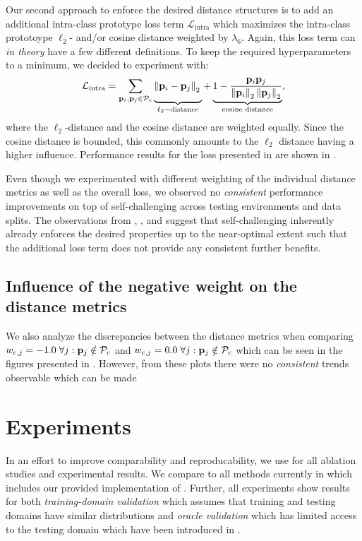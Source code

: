 Our second approach to enforce the desired distance structures is to add an additional intra-class prototype loss term $\mathcal{L}_\mathrm{intra}$ which maximizes the intra-class prototoype $\ell_2$- and/or cosine distance weighted by $\lambda_6$. Again, this loss term can \emph{in theory} have a few different definitions. To keep the required hyperparameters to a minimum, we decided to experiment with:
\begin{equation}
\label{eq:intra_loss}
    \mathcal{L}_\mathrm{intra} = \sum_{\proti_i, \prot \in \prots_c} \underbrace{\left\|\proti_i - \prot  \right\|_2 \vphantom{\frac{\proti_i\prot}{\left\|\proti_i \right\|_2 \left\|\prot \right\|_2}}}_{\ell_2-\text{distance}} + \underbrace{ 1-\frac{\proti_i\prot}{\left\|\proti_i \right\|_2 \left\|\prot \right\|_2}}_{\text{cosine distance}},
\end{equation}
where the $\ell_2$-distance and the cosine distance are weighted equally. Since the cosine distance is bounded, this commonly amounts to the $\ell_2$ distance having a higher influence. Performance results for the loss presented in  are shown in . 

Even though we experimented with different weighting of the individual distance metrics as well as the overall loss, we observed no \emph{consistent} performance improvements on top of self-challenging across testing environments and data splits. The observations from , , and  suggest that self-challenging inherently already enforces the desired properties up to the near-optimal extent such that the additional loss term does not provide any consistent further benefits.

\subsection{Influence of the negative weight on the distance metrics}
We also analyze the discrepancies between the distance metrics when comparing $w_{c,j} = -1.0\; \forall j: \mathbf{p}_{j} \notin \mathcal{P}_c$ and $w_{c,j} = 0.0\; \forall j: \mathbf{p}_{j} \notin \mathcal{P}_c$ which can be seen in the figures presented in . However, from these plots there were no \emph{consistent} trends observable which can be made  

\section{Experiments}
In an effort to improve comparability and reproducability, we use \domainbed \citep{gulrajani2020search} for all ablation studies and experimental results. We compare to all methods currently in \domainbed which includes our provided implementation of \rsc. Further, all experiments show results for both \emph{training-domain validation} which assumes that training and testing domains have similar distributions  and \emph{oracle validation} which has limited access to the testing domain which have been introduced in .

